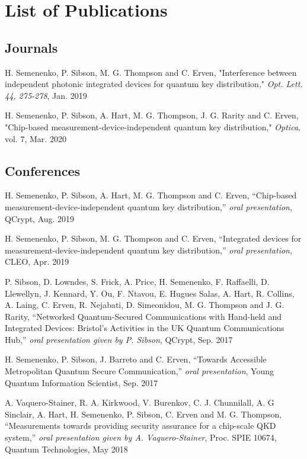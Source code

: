 %
{\setlength{\parindent}{0pt} %
\abnormalparskip{18pt} %
\chapter*{List of Publications}
\section*{Journals}

H. Semenenko, P. Sibson, M. G. Thompson and C. Erven, "Interference between independent photonic integrated devices for quantum key distribution," \textit{Opt. Lett. 44, 275-278}, Jan. 2019 

H. Semenenko, P. Sibson, A. Hart, M. G. Thompson, J. G. Rarity  and C. Erven, "Chip-based measurement-device-independent quantum key distribution," \textit{Optica}, vol. 7, Mar. 2020

\section*{Conferences}

H. Semenenko, P. Sibson, A. Hart, M. G. Thompson and C. Erven, ``Chip-based measurement-device-independent quantum key distribution,'' \textit{oral presentation}, QCrypt, Aug. 2019

H. Semenenko, P. Sibson, M. G. Thompson and C. Erven, ``Integrated devices for measurement-device-independent quantum key distribution,'' \textit{oral presentation}, CLEO, Apr. 2019

P. Sibson, D. Lowndes, S. Frick, A. Price, H. Semenenko, F. Raffaelli, D. Llewellyn, J. Kennard, Y. Ou, F. Ntavou, E. Hugues Salas, A. Hart, R. Collins, A. Laing, C. Erven, R. Nejabati, D. Simeonidou, M. G. Thompson and J. G. Rarity, ``Networked Quantum-Secured Communications with Hand-held and Integrated Devices: Bristol’s Activities in the UK Quantum Communications Hub,'' \textit{oral presentation given by P. Sibson}, QCrypt, Sep. 2017

H. Semenenko, P. Sibson, J. Barreto and C. Erven, ``Towards Accessible Metropolitan Quantum Secure Communication,'' \textit{oral presentation}, Young Quantum Information Scientist, Sep. 2017 

A. Vaquero-Stainer, R. A. Kirkwood, V. Burenkov, C. J. Chunnilall, A. G Sinclair, A. Hart, H. Semenenko, P. Sibson, C. Erven and M. G. Thompson, ``Measurements towards providing security assurance for a chip-scale QKD system,'' \textit{oral presentation given by A. Vaquero-Stainer}, Proc. SPIE 10674, Quantum Technologies, May 2018

}
